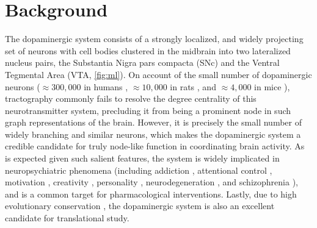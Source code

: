 \section{Background}


The dopaminergic system consists of a strongly localized, and widely projecting set of neurons with cell bodies clustered in the midbrain into two lateralized nucleus pairs, the Substantia Nigra pars compacta (SNc) and the Ventral Tegmental Area (VTA, \cref{fig:ml}).
On account of the small number of dopaminergic neurons ($\approx300,000$ in humans \cite{rice2016}, $\approx10,000$ in rats \cite{german1993}, and $\approx4,000$ in mice \cite{triarhou1988}), tractography commonly fails to resolve the degree centrality of this neurotransmitter system, precluding it from being a prominent node in such graph representations of the brain.
However, it is precisely the small number of widely branching and similar neurons, which makes the dopaminergic system a credible candidate for truly node-like function in coordinating brain activity.
As is expected given such salient features, the system is widely implicated in neuropsychiatric phenomena (including
addiction \cite{DiChiara1988,DiChiara1999},
attentional control \cite{Nieoullon2002},
motivation \cite{Salamone1994},
creativity \cite{Chermahini2010},
personality \cite{Depue1999},
neurodegeneration \cite{Masliah2000},
and schizophrenia \cite{Howes2009}),
and is a common target for pharmacological interventions.
Lastly, due to high evolutionary conservation \cite{Yamamoto2011}, the dopaminergic system is also an excellent candidate for translational study.

